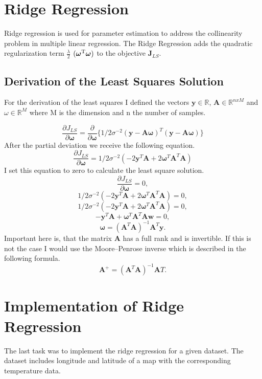 \documentclass[10pt, a4paper, twocolumn]{article} %
\begin{document}
\section{Ridge Regression}
Ridge regression is used for parameter estimation to address the collinearity problem in multiple linear regression. 
\citep{ridgeRegression} The Ridge Regression adds the quadratic regularization term 
$\frac{\lambda}{2}$
$(\boldsymbol{\omega}\textsuperscript{T}\boldsymbol{\omega})$ to the objective $\textbf{J}_{LS}$.
\citep{bookMachineLearning}

\subsection{Derivation of the Least Squares Solution}
For the derivation of the least squares I defined the vectors $\textbf{y} \in \mathbb{R}$,
$\textbf{A} \in \mathbb{R}^{nxM}$ and
$\textbf{$\omega$} \in \mathbb{R}^{M}$ where M is the dimension and n the number of samples.

\[
\frac{\partial \textbf{$J_{LS}$}}{\partial \boldsymbol{\omega}} = 
\frac{\partial}{\partial \boldsymbol{\omega}}
\{1/2\sigma^{-2}
(\textbf{y} - \textbf{A}\boldsymbol{\omega})^{T}
(\textbf{y} - \textbf{A}\boldsymbol{\omega})
\}
\]
After the partial deviation we receive the following equation. 
\[
\frac{\partial \textbf{$J_{LS}$}}{\partial \boldsymbol{\omega}} = 
1/2\sigma^{-2}
(-2 \textbf{y}^{T} \textbf{A} + 2 \boldsymbol{\omega}^{T}\textbf{A}^{T}\textbf{A})
\]
I set this equation to zero to calculate the least square solution. 
\[
\frac{\partial \textbf{$J_{LS}$}}{\partial \boldsymbol{\omega}} = 0,
\]
\[
1/2\sigma^{-2}
(-2 \textbf{y}^{T} \textbf{A} + 2 \boldsymbol{\omega}^{T}\textbf{A}^{T}\textbf{A}) = 0,
\]
\[
1/2\sigma^{-2}
(-2 \textbf{y}^{T} \textbf{A} + 2 \boldsymbol{\omega}^{T}\textbf{A}^{T}\textbf{A}) = 0,
\]
\[
-\textbf{y}^{T} \textbf{A} + \boldsymbol{\omega}^{T} \textbf{A}^{T}\textbf{A}\boldsymbol{w} = 0,
\]
\[
 \boldsymbol{\omega} = (\textbf{A}^{T}\textbf{A})^{-1}\textbf{A}^{T}\textbf{y}.
\]
\citep{bookMachineLearning}
Important here is, that the matrix \textbf{A} has a full rank and is invertible. If this is not the case I would use 
the Moore–Penrose inverse which is described in the following formula. 
\[
\textbf{A}^{+} = (\textbf{A}^{T}\textbf{A})^{-1}\textbf{A}{T}.
\]
\citep{bookMachineLearning}


\section{Implementation of Ridge Regression}
The last task was to implement the ridge regression for a given dataset. The dataset includes longitude and latitude of a map with the corresponding temperature data. 
\end{document}
